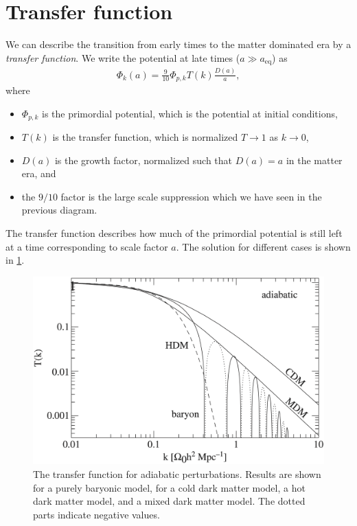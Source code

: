 \section{Transfer function}
We can describe the transition from early times to the matter dominated era by a \emph{transfer function}. We write the potential at late times ($a \gg a_\text{eq}$) as
\begin{align*}
	\Phi_k(a) = \frac{9}{10} \Phi_{p, k} T(k) \frac{D(a)}{a},
\end{align*}
where
\begin{itemize}
	\item $\Phi_{p, k}$ is the primordial potential, which is the potential at initial conditions,
	\item $T(k)$ is the transfer function, which is normalized $T \to 1$ as $k \to 0$,
	\item $D(a)$ is the growth factor, normalized such that $D(a) = a$ in the matter era, and
	\item the $9/10$ factor is the large scale suppression which we have seen in the previous diagram.
\end{itemize}
The transfer function describes how much of the primordial potential is still left at a time corresponding to scale factor $a$.
The solution for different cases is shown in \cref{fig:transfer-function}.
\begin{figure}
	\centering
	\includegraphics[width=\textwidth]{img/ch-03/transfer-function.png}
	\caption{The transfer function for adiabatic perturbations. Results are shown for a purely baryonic model, for a cold dark matter model, a hot dark matter model, and a mixed dark matter model. The dotted parts indicate negative values.}
	\label{fig:transfer-function}
\end{figure}

